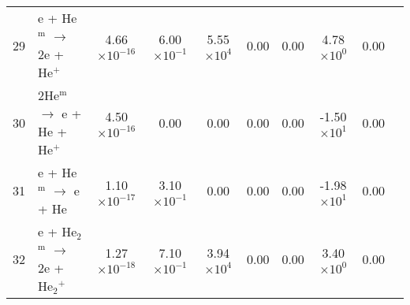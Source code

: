 \documentclass{article}
\begin{document}
\begin{table}[H]
{\begin{tabu}{clcccccccc}
      29 & e + He$^\text{m}$ $\rightarrow$ 2e + He$^{+}$ & 4.66$\times 10^{-16}$ & 6.00$\times 10^{-1}$ & 5.55$\times 10^{4}$ & 0.00 & 0.00 & 4.78$\times 10^{0}$ & 0.00 & \cite{ionin2007physics} \\
      30 & 2He$^\text{m}$ $\rightarrow$ e + He + He$^{+}$ & 4.50$\times 10^{-16}$ & 0.00 & 0.00 & 0.00 & 0.00 & -1.50$\times 10^{1}$ & 0.00 & \cite{ionin2007physics} \\
      31 & e + He$^\text{m}$ $\rightarrow$ e + He & 1.10$\times 10^{-17}$ & 3.10$\times 10^{-1}$ & 0.00 & 0.00 & 0.00 & -1.98$\times 10^{1}$ & 0.00 & \cite{ionin2007physics} \\
      32 & e + He$_2$$^\text{m}$ $\rightarrow$ 2e + He$_{2}$$^{+}$ & 1.27$\times 10^{-18}$ & 7.10$\times 10^{-1}$ & 3.94$\times 10^{4}$ & 0.00 & 0.00 & 3.40$\times 10^{0}$ & 0.00 & \cite{ionin2007physics} \\
    \end{tabu}
  }
\end{table}
\end{document}
